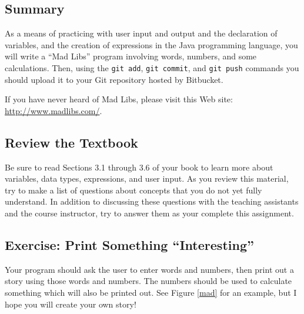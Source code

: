 



\subsection*{Summary}

As a means of practicing with user input and output and the declaration of variables, and the creation of expressions in
the Java programming language, you will write a ``Mad Libs'' program involving words, numbers, and some calculations.
Then, using the {\tt git add}, {\tt git commit}, and {\tt git push} commands you should upload it to your Git repository
hosted by Bitbucket.  

\noindent
If you have never heard of Mad Libs, please visit this Web site: \url{http://www.madlibs.com/}. 

\subsection*{Review the Textbook}

Be sure to read Sections 3.1 through 3.6 of your book to learn more about variables, data types, expressions, and user
input.  As you review this material, try to make a list of questions about concepts that you do not yet fully
understand.  In addition to discussing these questions with the teaching assistants and the course instructor, try to
answer them as your complete this assignment.

\subsection*{Exercise: Print Something ``Interesting''}

Your program should ask the user to enter words and numbers, then print out
a story using those words and numbers. The numbers should be used to
calculate something which will also be printed out. See Figure \ref{mad}
for an example, but I hope you will create your own story!

